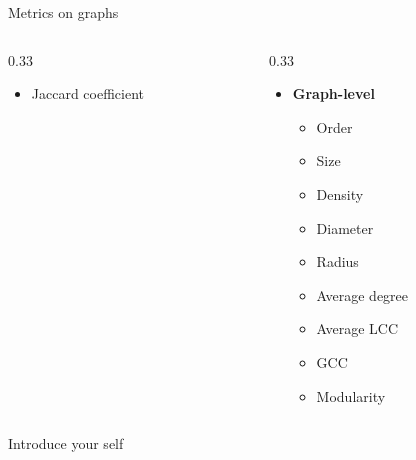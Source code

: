 \documentclass[aspectratio=169]{beamer}
\renewcommand{\alert}[1]{\textbf{\color{swufe}#1}}
\begin{document}
\begin{frame}{Metrics on graphs}
\begin{columns}[t]
\begin{column}{0.33\textwidth}
\begin{itemize}
\begin{itemize}
                        \item Jaccard coefficient
                    \end{itemize}
                \end{itemize}
            \end{column}
            \begin{column}{0.33\textwidth}
                \begin{itemize}
                    \item \alert{Graph-level}
                    \begin{itemize}
                        \item Order
                        \item Size
                        \item Density
                        \item Diameter
                        \item Radius
                        \item Average degree
                        \item Average LCC
                        \item GCC
                        \item Modularity
                    \end{itemize}
                \end{itemize}
            \end{column}
        \end{columns}

        \begin{note}
            {Introduce your self}
        \end{note}
    \end{frame}
\end{document}
